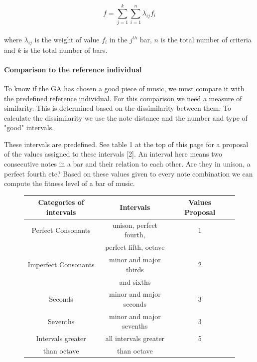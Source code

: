 \documentclass[12pt]{article}
\begin{document}
\begin{equation}
f = \sum_{j = 1}^{k} \sum_{i = 1}^{n}\lambda_{ij} f_i
\end{equation}
\\
where $\lambda_{ij}$ is the weight of value $f_i$ in the $j^{th}$ bar, $n$ is the total number of criteria and $k$ is the total number of bars.

\paragraph{Comparison to the reference individual}

To know if the GA has chosen a good piece of music, we must compare it with the predefined reference individual. For this comparison we need a measure of similarity. This is determined based on the dissimilarity between them. To calculate the dissimilarity we use the note distance and the number and type of "good" intervals.
\newline

These intervals are predefined. See table 1 at the top of this page for a proposal of the values assigned to these intervals [2]. An interval here means two consecutive notes in a bar and their relation to each other. Are they in unison, a perfect fourth etc? Based on these values given to every note combination we can compute the fitness level of a bar of music.

\begin{figure}
\begin{tabular}{| c | c | c | c |}
\hline
\textbf{Categories of intervals} & \textbf{Intervals} & \textbf{Values Proposal} \\
\hline
Perfect Consonants & unison, perfect fourth, & 1  \\ 
& perfect fifth, octave & \\
\hline
Imperfect Consonants & minor and major thirds & 2 \\
& and sixths & \\
\hline
Seconds & minor and major seconds & 3 \\
 \hline
Sevenths & minor and major sevenths & 3 \\
\hline
Intervals greater & all intervals greater & 5 \\
than octave & than octave & \\

\hline
\end{tabular}
\end{figure}
\end{document}
